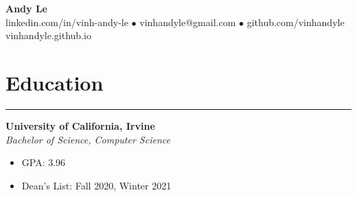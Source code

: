\documentclass{article}
\begin{document}
   \begin{center}
      \Huge\textbf{Andy Le}\\
      \normalsize{linkedin.com/in/vinh-andy-le} $\bullet$
      \normalsize{vinhandyle@gmail.com} $\bullet$
      \normalsize{github.com/vinhandyle}\\
      \normalsize{vinhandyle.github.io}
   \end{center}
\vspace{-20pt}

\section*{Education} \vspace{-6pt} \hrule \vspace{6pt}
\textbf{University of California, Irvine}\\
\textit{Bachelor of Science, Computer Science}
\begin{itemize}
	\item\vspace{-6pt} GPA: 3.96
	\item\vspace{-6pt} Dean's List: Fall 2020, Winter 2021
\end{itemize}
\vspace{-20pt}
\end{document}
